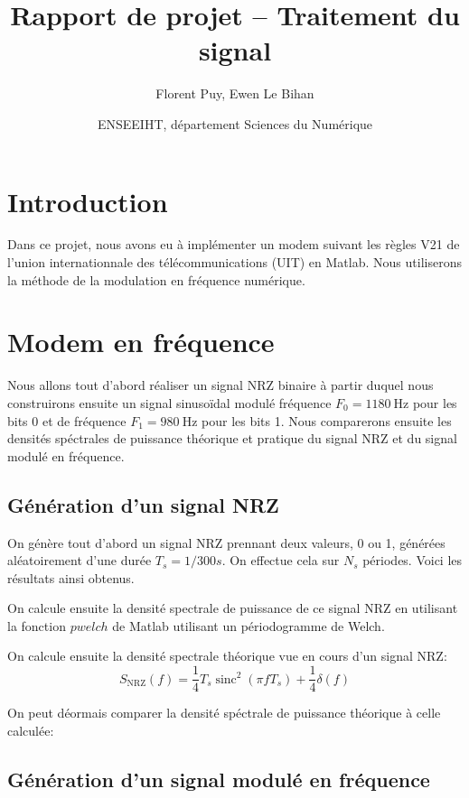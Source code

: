 \documentclass{article}
\title{Rapport de projet -- Traitement du signal}
\author{Florent Puy, Ewen Le Bihan}
\date{ENSEEIHT, département Sciences du Numérique}
\newcommand{\sinc}{\operatorname{sinc}}
\begin{document}
\maketitle



\tableofcontents

\section{Introduction}

Dans ce projet, nous avons eu à implémenter un modem suivant les règles V21 de l'union internationnale des télécommunications (UIT) en Matlab. Nous utiliserons la méthode de la modulation en fréquence numérique.

\section{Modem en fréquence}

Nous allons tout d'abord réaliser un signal NRZ binaire à partir duquel nous construirons ensuite un signal sinusoïdal modulé fréquence $F_0=\SI{1180}{\hertz}$ pour les bits 0 et de fréquence $F_1=\SI{980}{\hertz}$ pour les bits 1.
Nous comparerons ensuite les densités spéctrales de puissance théorique et pratique du signal NRZ et du signal modulé en fréquence.

\subsection{Génération d'un signal NRZ}

On génère tout d'abord un signal NRZ prennant deux valeurs, 0 ou 1, générées aléatoirement d'une durée $T_s=1/300 s$. On effectue cela sur $N_s$ périodes. Voici les résultats ainsi obtenus.



On calcule ensuite la densité spectrale de puissance de ce signal NRZ en utilisant la fonction $pwelch$ de Matlab utilisant un périodogramme de Welch.

On calcule ensuite la densité spectrale théorique vue en cours d'un signal NRZ:
\[
S_\text{NRZ}(f)=\frac{1}{4} T_s \sinc^2(\pi f T_s)+\frac{1}{4} \delta(f)
\]

On peut déormais comparer la densité spéctrale de puissance théorique à celle calculée:



\subsection{Génération d'un signal modulé en fréquence}
\end{document}
